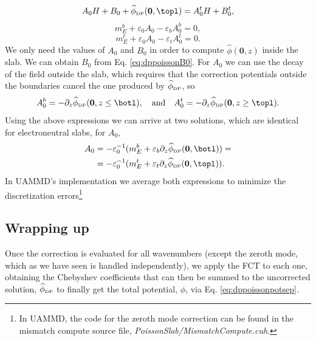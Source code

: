 \documentclass[ twoside,openright,titlepage,numbers=noenddot,%
headinclude,footinclude,cleardoublepage=empty,abstract=on,
BCOR=5mm,paper=b5,fontsize=11pt, dvipsnames
]{scrreprt}
\renewcommand{\vec}[1]{\bm{#1}}
\newcommand{\uammd}{\gls{UAMMD}\xspace}
\newcommand{\fou}[1]{\widehat{#1}}
\newcommand{\corr}{\text{corr}}
\newcommand{\dpr}{\text{\tiny DP}}
\begin{document}
\begin{equation}
  A_0H + B_0 + \fou{\phi}_{\dpr}(\vec{0}, \topl) = A_0^tH + B_0^t,
\end{equation}
\begin{equation}
  m_E^b +\varepsilon_0A_0-\varepsilon_bA_0^b = 0,
\end{equation}
\begin{equation}
  m_E^t +\varepsilon_0A_0-\varepsilon_tA_0^t = 0.
\end{equation}
We only need the values of $A_0$ and $B_0$ in order to compute $\fou{\phi}(\vec{0},z)$ inside the slab. We can obtain $B_0$ from Eq. \eqref{eq:dppoissonB0}. For $A_0$ we can use the decay of the field outside the slab, which requires that the correction potentials outside the boundaries cancel the one produced by $\fou{\phi}_{\dpr}$, so
\begin{equation}
  A_0^b = -\partial_z\fou{\phi}_{\dpr}(\vec{0}, z\le\botl),\quad\text{and}\quad A_0^t = -\partial_z\fou{\phi}_{\dpr}(\vec{0}, z\ge\topl).
\end{equation}
Using the above expressions we can arrive at two solutions, which are identical for electroneutral slabs, for $A_0$,
\begin{equation}
  \begin{aligned}
    A_0 &= -\varepsilon_0^{-1}(m_E^b +\varepsilon_b\partial_z\fou{\phi}_{\dpr}(\vec{0}, \botl)) =\\
    &= -\varepsilon_0^{-1}(m_E^t +\varepsilon_t\partial_z\fou{\phi}_{\dpr}(\vec{0}, \topl)).
\end{aligned}
\end{equation}
In \uammd's implementation we average both expressions to minimize the discretization errors\footnote{In \uammd, the code for the zeroth mode correction can be found in the mismatch compute source file, \emph{PoissonSlab/MismatchCompute.cuh}.}

%
%
%

\subsection{Wrapping up}
Once the correction is evaluated for all wavenumbers (except the zeroth mode, which as we have seen is handled independently), we apply the \gls{FCT} to each one, obtaining the Chebyshev coefficients that can then be summed to the uncorrected solution, $\fou{\phi}_{\dpr}$ to finally get the total potential, $\phi$, via Eq. \eqref{eq:dppoissonpotsep}.
\end{document}
